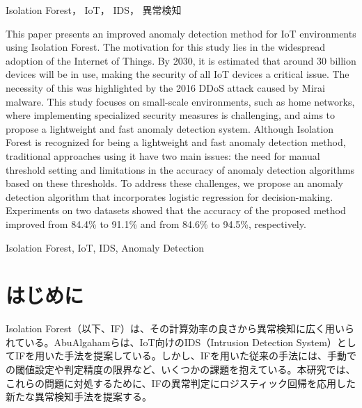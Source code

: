 \documentclass{css}
\begin{document}

\begin{jkeyword}
Isolation Forest， IoT， IDS， 異常検知
\end{jkeyword}

\begin{eabstract}
    This paper presents an improved anomaly detection method for IoT environments using Isolation Forest. The motivation for this study lies in the widespread adoption of the Internet of Things. By 2030, it is estimated that around 30 billion devices will be in use, making the security of all IoT devices a critical issue. The necessity of this was highlighted by the 2016 DDoS attack caused by Mirai malware. This study focuses on small-scale environments, such as home networks, where implementing specialized security measures is challenging, and aims to propose a lightweight and fast anomaly detection system. Although Isolation Forest is recognized for being a lightweight and fast anomaly detection method, traditional approaches using it have two main issues: the need for manual threshold setting and limitations in the accuracy of anomaly detection algorithms based on these thresholds. To address these challenges, we propose an anomaly detection algorithm that incorporates logistic regression for decision-making. Experiments on two datasets showed that the accuracy of the proposed method improved from 84.4\% to 91.1\% and from 84.6\% to 94.5\%, respectively.
\end{eabstract}


\begin{ekeyword}
Isolation Forest, IoT, IDS, Anomaly Detection
\end{ekeyword}


\maketitle

\section{はじめに}
Isolation Forest（以下、IF）は、その計算効率の良さから異常検知に広く用いられている。AbuAlgahamらは、IoT向けのIDS（Intrusion Detection System）としてIFを用いた手法を提案している\cite{AbuAlghanam2023-sx}。しかし、IFを用いた従来の手法には、手動での閾値設定や判定精度の限界など、いくつかの課題を抱えている。本研究では、これらの問題に対処するために、IFの異常判定にロジスティック回帰を応用した新たな異常検知手法を提案する。
\end{document}
